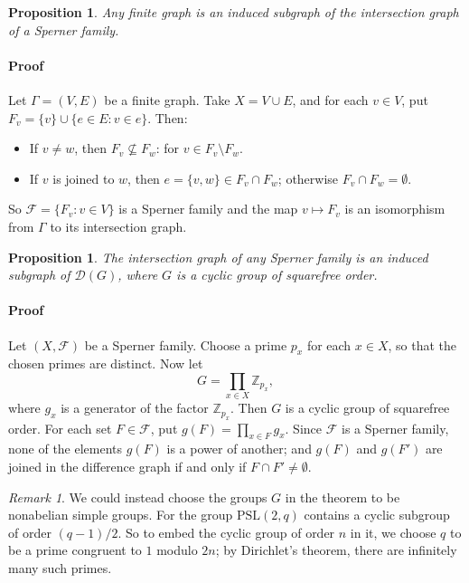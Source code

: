 \documentclass[12pt]{amsart}
\theoremstyle{plain}
\newtheorem{proposition}[theorem]{Proposition}
\theoremstyle{remark}
\newtheorem{remark}[theorem]{Remark}
\theoremstyle{definition}
\begin{document}
\begin{proposition}
Any finite graph is an induced subgraph of the intersection graph of a
Sperner family.
\end{proposition}

\paragraph{Proof} Let $\Gamma=(V,E)$ be a finite graph. Take $X=V\cup E$,
and for each $v\in V$, put $F_v=\{v\}\cup\{e\in E:v\in e\}$. Then:
\begin{itemize}
\item If $v\ne w$, then $F_v\not\subseteq F_w$: for $v\in F_v\setminus F_w$.
\item If $v$ is joined to $w$, then $e=\{v,w\}\in F_v\cap F_w$; otherwise
$F_v\cap F_w=\emptyset$.
\end{itemize}
So $\mathcal{F}=\{F_v:v\in V\}$ is a Sperner family and the map $v\mapsto F_v$
is an isomorphism from $\Gamma$ to its intersection graph.

\begin{proposition}
The intersection graph of any Sperner family is an induced subgraph
of $\mathcal{D}(G)$, where $G$ is a cyclic group of squarefree order.
\end{proposition}

\paragraph{Proof} Let $(X,\mathcal{F})$ be a Sperner family. Choose a prime
$p_x$ for each $x\in X$, so that the chosen primes are distinct. Now let
\[G=\prod_{x\in X}\mathbb{Z}_{p_x},\]
where $g_x$ is a generator of the factor $\mathbb{Z}_{p_x}$. Then $G$ is
a cyclic group of squarefree order. For
each set $F\in\mathcal{F}$, put $g(F)=\prod_{x\in F}g_x$. Since $\mathcal{F}$
is a Sperner family, none of the elements $g(F)$ is a power of another;
and $g(F)$ and $g(F')$ are joined in the difference graph if and only if
$F\cap F'\ne\emptyset$.

\begin{remark} 
We could instead choose the groups $G$ in the theorem to
be nonabelian simple groups. For the group $\mathrm{PSL}(2,q)$ contains a
cyclic subgroup of order $(q-1)/2$. So to embed the cyclic group of order $n$
in it, we choose $q$ to be a prime congruent to $1$ modulo $2n$; by Dirichlet's
theorem, there are infinitely many such primes.
\end{remark}
\end{document}
